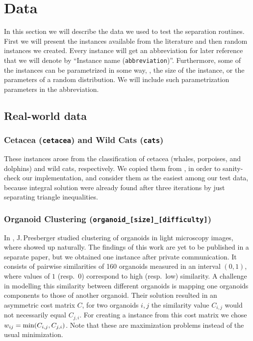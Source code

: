 \section{Data}\label{sec:data}
In this section we will describe the data we used to test the separation routines.
First we will present the instances available from the literature and then random instances we created.
Every instance will get an abbreviation for later reference that we will denote by “Instance name (\texttt{abbreviation})”.
Furthermore, some of the instances can be parametrized in some way, \eg, the size of the instance, or the parameters of a random distribution.
We will include such parametrization parameters in the abbreviation.

\subsection{Real-world data}
\subsubsection{Cetacea (\texttt{cetacea}) and Wild Cats (\texttt{cats})}\label{subsubsec:data_cetacea}
These instances arose from the classification of cetacea (whales, porpoises, and dolphins) and wild cats, respectively.
We copied them from \cite{grotschelCuttingPlaneAlgorithm1989}, in order to sanity-check our implementation,
and consider them as the easiest among our test data, because integral solution were already found after three iterations by just separating triangle inequalities.

\subsubsection{Organoid Clustering (\texttt{organoid\_[size]\_[difficulty]})}
In \cite{presbergerSegmentationClusteringOrganoids2023}, J.\,Presberger studied clustering of organoids in light microscopy images, where \CP showed up naturally.
The findings of this work are yet to be published in a separate paper, but we obtained one instance after private communication.
It consists of pairwise similarities of 160 organoids measured in an interval $(0,1)$, where values of $1$ (resp.\ $0$) correspond to high (resp.\ low) similarity.
A challenge in modelling this similarity between different organoids is mapping one organoids components to those of another organoid.
Their solution resulted in an asymmetric cost matrix $C$, \ie for two organoids $i, j$ the similarity value $C_{i,j}$ would not necessarily equal $C_{j,i}$.
For creating a \CP instance from this cost matrix we chose $w_{ij} = \operatorname{\text{min}}(C_{i,j}, C_{j,i})$.
Note that these are maximization problems instead of the usual minimization.

